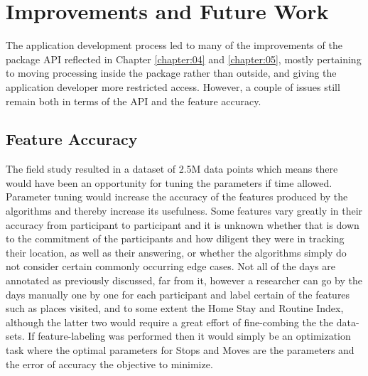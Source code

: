 \section{Improvements and Future Work}
The application development process led to many of the improvements of the package API reflected in Chapter \ref{chapter:04} and \ref{chapter:05}, mostly pertaining to moving processing inside the package rather than outside, and giving the application developer more restricted access. However, a couple of issues still remain both in terms of the API and the feature accuracy.

\subsection{Feature Accuracy}
The field study resulted in a dataset of 2.5M data points which means there would have been an opportunity for tuning the parameters if time allowed. Parameter tuning would increase the accuracy of the features produced by the algorithms and thereby increase its usefulness. Some features vary greatly in their accuracy from participant to participant and it is unknown whether that is down to the commitment of the participants and how diligent they were in tracking their location, as well as their answering, or whether the algorithms simply do not consider certain commonly occurring edge cases. Not all of the days are annotated as previously discussed, far from it, however a researcher can go by the days manually one by one for each participant and label certain of the features such as places visited, and to some extent the Home Stay and Routine Index, although the latter two would require a great effort of fine-combing the the data-sets. If feature-labeling was performed then it would simply be an optimization task where the optimal parameters for Stops and Moves are the parameters and the error of accuracy the objective to minimize. 

